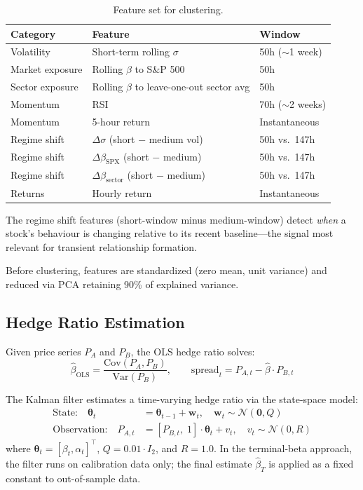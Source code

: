 \documentclass[11pt, a4paper]{article}
\begin{document}
\begin{table}[H]
\centering
\caption{Feature set for clustering.}
\begin{tabular}{@{}lll@{}}
\toprule
\textbf{Category} & \textbf{Feature} & \textbf{Window} \\
\midrule
Volatility      & Short-term rolling $\sigma$           & 50h ($\sim$1 week) \\
Market exposure & Rolling $\beta$ to S\&P 500           & 50h \\
Sector exposure & Rolling $\beta$ to leave-one-out sector avg & 50h \\
Momentum        & RSI                                    & 70h ($\sim$2 weeks) \\
Momentum        & 5-hour return                          & Instantaneous \\
Regime shift    & $\Delta\sigma$ (short $-$ medium vol)  & 50h vs.\ 147h \\
Regime shift    & $\Delta\beta_{\text{SPX}}$ (short $-$ medium) & 50h vs.\ 147h \\
Regime shift    & $\Delta\beta_{\text{sector}}$ (short $-$ medium) & 50h vs.\ 147h \\
Returns         & Hourly return                          & Instantaneous \\
\bottomrule
\end{tabular}
\label{tab:features}
\end{table}

The regime shift features (short-window minus medium-window) detect \textit{when} a stock's behaviour is changing relative to its recent baseline---the signal most relevant for transient relationship formation.

Before clustering, features are standardized (zero mean, unit variance) and reduced via PCA retaining 90\% of explained variance.

\subsection{Hedge Ratio Estimation}

Given price series $P_A$ and $P_B$, the OLS hedge ratio solves:
\[
\hat{\beta}_{\text{OLS}} = \frac{\text{Cov}(P_A, P_B)}{\text{Var}(P_B)}, \qquad \text{spread}_t = P_{A,t} - \hat{\beta} \cdot P_{B,t}
\]

The Kalman filter estimates a time-varying hedge ratio via the state-space model:
\begin{align}
\text{State:} \quad \boldsymbol{\theta}_t &= \boldsymbol{\theta}_{t-1} + \boldsymbol{w}_t, \quad \boldsymbol{w}_t \sim \mathcal{N}(\mathbf{0}, Q) \label{eq:kalman-state} \\
\text{Observation:} \quad P_{A,t} &= [P_{B,t}, \; 1] \cdot \boldsymbol{\theta}_t + v_t, \quad v_t \sim \mathcal{N}(0, R) \label{eq:kalman-obs}
\end{align}
where $\boldsymbol{\theta}_t = [\beta_t, \alpha_t]^\top$, $Q = 0.01 \cdot I_2$, and $R = 1.0$. In the terminal-beta approach, the filter runs on calibration data only; the final estimate $\hat{\beta}_T$ is applied as a fixed constant to out-of-sample data.
\end{document}
